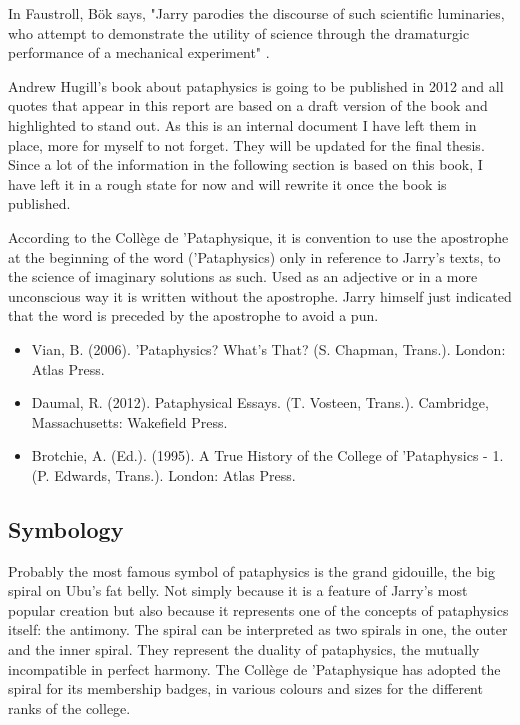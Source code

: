 In Faustroll, Bök says, "Jarry parodies the discourse of such scientific luminaries, who attempt to demonstrate the utility of science through the dramaturgic performance of a mechanical experiment" \citep[p.29]{Bok2002}.

\begin{shaded}
  Andrew Hugill's book about pataphysics \citep{Hugill2012} is going to be published in 2012 and all quotes that appear in this report are based on a draft version of the book and highlighted to stand out. As this is an internal document I have left them in place, more for myself to not forget. They will be updated for the final thesis. Since a lot of the information in the following section is based on this book, I have left it in a rough state for now and will rewrite it once the book is published.
\end{shaded}

According to the Collège de 'Pataphysique, it is convention to use the apostrophe at the beginning of the word ('Pataphysics) only in reference to Jarry's texts, to the science of imaginary solutions as such. Used as an adjective or in a more unconscious way it is written without the apostrophe. Jarry himself just indicated that the word is preceded by the apostrophe to avoid a pun.

\begin{itemize}
  \item Vian, B. (2006). 'Pataphysics? What's That? (S. Chapman, Trans.). London: Atlas Press.\citep{Vian2006}
  \item Daumal, R. (2012). Pataphysical Essays. (T. Vosteen, Trans.). Cambridge, Massachusetts: Wakefield Press.\citep{Daumal2012}
  \item Brotchie, A. (Ed.). (1995). A True History of the College of  'Pataphysics - 1. (P. Edwards, Trans.). London: Atlas Press.\citep{Brotchie1995}
\end{itemize}

\subsection{Symbology}

Probably the most famous symbol of pataphysics is the grand gidouille, the big spiral on Ubu's fat belly. Not simply because it is a feature of Jarry's most popular creation but also because it represents one of the concepts of pataphysics itself: the antimony. The spiral can be interpreted as two spirals in one, the outer and the inner spiral. They represent the duality of pataphysics, the mutually incompatible in perfect harmony. The Collège de 'Pataphysique has adopted the spiral for its membership badges, in various colours and sizes for the different ranks of the college.

